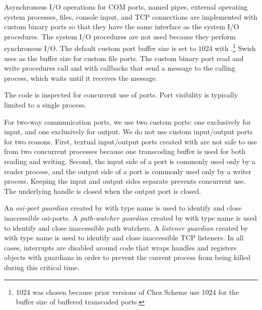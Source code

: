 Asynchronous I/O operations for COM ports, named pipes, external
operating system processes, files, console input, and TCP connections
are implemented with custom binary ports so that they have the same
interface as the system I/O procedures. The system I/O procedures are
not used because they perform synchronous I/O.  The default custom port buffer
size is set to 1024 with .\footnote{1024 was
chosen because prior versions of Chez Scheme use 1024 for the buffer size
of buffered transcoded ports.}
Swish uses  as the buffer size for custom file
ports.  The custom binary port read and write procedures call
 and  with callbacks that
send a message to the calling process, which waits until it receives
the message.

  \mitigation The code is
inspected for concurrent use of ports. Port visibility is typically
limited to a single process.

For two-way communication ports, we use two custom ports: one
exclusively for input, and one exclusively for output. We do not use
custom input/output ports for two reasons.  First, textual
input/output ports created with  are not safe
to use from two concurrent processes because one transcoding buffer is
used for both reading and writing.  Second, the input side of a port
is commonly used only by a reader process, and the output side of a
port is commonly used only by a writer process.  Keeping the input and
output sides separate prevents concurrent use. The underlying handle
is closed when the output port is closed.

  \mitigation An
\emph{osi-port guardian}
created by  with type name 
is used to identify and close inaccessible osi-ports.
A \emph{path-watcher guardian}
created by  with type name 
is used to identify and close inaccessible path
watchers.  A \emph{listener
  guardian}
created by  with type name 
is used to identify and close inaccessible TCP listeners. In all cases, interrupts are disabled around code that
wraps handles and registers objects with guardians in order to prevent
the current process from being killed during this critical time.

